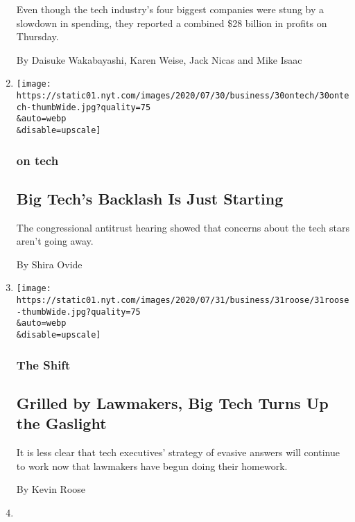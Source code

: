 \begin{enumerate}
  Even though the tech industry's four biggest companies were stung by a
  slowdown in spending, they reported a combined \$28 billion in profits
  on Thursday.

  By Daisuke Wakabayashi, Karen Weise, Jack Nicas and Mike Isaac
\item
  \href{/2020/07/30/technology/big-tech-backlash.html}{}

  \texttt{[image: https://static01.nyt.com/images/2020/07/30/business/30ontech/30ontech-thumbWide.jpg?quality=75\\\&auto=webp\\\&disable=upscale]}

  \hypertarget{on-tech-1}{%
  \subsubsection{on tech}\label{on-tech-1}}

  \hypertarget{big-techs-backlash-is-just-starting}{%
  \subsection{Big Tech's Backlash Is Just
  Starting}\label{big-techs-backlash-is-just-starting}}

  The congressional antitrust hearing showed that concerns about the
  tech stars aren't going away.

  By Shira Ovide
\item
  \href{/2020/07/30/technology/big-tech-ceos.html}{}

  \texttt{[image: https://static01.nyt.com/images/2020/07/31/business/31roose/31roose-thumbWide.jpg?quality=75\\\&auto=webp\\\&disable=upscale]}

  \hypertarget{the-shift}{%
  \subsubsection{The Shift}\label{the-shift}}

  \hypertarget{grilled-by-lawmakers-big-tech-turns-up-the-gaslight}{%
  \subsection{Grilled by Lawmakers, Big Tech Turns Up the
  Gaslight}\label{grilled-by-lawmakers-big-tech-turns-up-the-gaslight}}

  It is less clear that tech executives' strategy of evasive answers
  will continue to work now that lawmakers have begun doing their
  homework.

  By Kevin Roose
\item
  \href{/2020/07/30/technology/europe-new-phase-tech-amazon-apple-facebook-google.html}{}


\end{enumerate}
